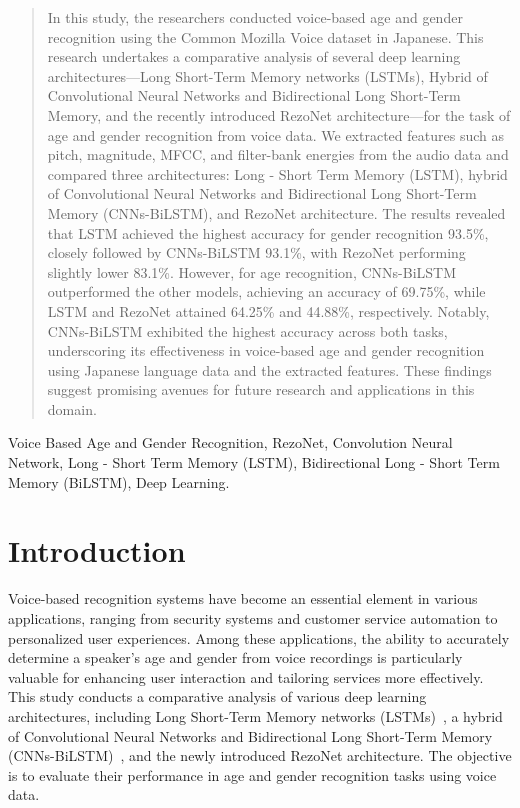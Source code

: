 \documentclass[conference, 10pt,onecolumn]{IEEEtran}
\begin{document}
\begin{abstract}

In this study, the researchers conducted voice-based age and gender recognition using the Common Mozilla Voice dataset in Japanese. This research undertakes a comparative analysis of several deep learning architectures—Long Short-Term Memory networks (LSTMs), Hybrid of Convolutional Neural Networks and Bidirectional Long Short-Term Memory, and the recently introduced RezoNet architecture—for the task of age and gender recognition from voice data. We extracted features such as pitch, magnitude, MFCC, and filter-bank energies from the audio data and compared three architectures: Long - Short Term Memory (LSTM), hybrid of Convolutional Neural Networks and Bidirectional Long Short-Term Memory (CNNs-BiLSTM), and RezoNet architecture. The results revealed that LSTM achieved the highest accuracy for gender recognition 93.5\%, closely followed by CNNs-BiLSTM 93.1\%, with RezoNet performing slightly lower 83.1\%. However, for age recognition, CNNs-BiLSTM outperformed the other models, achieving an accuracy of 69.75\%, while LSTM and RezoNet attained 64.25\% and 44.88\%, respectively. Notably, CNNs-BiLSTM exhibited the highest accuracy across both tasks, underscoring its effectiveness in voice-based age and gender recognition using Japanese language data and the extracted features. These findings suggest promising avenues for future research and applications in this domain.
\end{abstract}

\begin{IEEEkeywords}
Voice Based Age and Gender Recognition, RezoNet, Convolution Neural Network, Long - Short Term Memory (LSTM), Bidirectional Long - Short Term Memory (BiLSTM), Deep Learning.
\end{IEEEkeywords}

\section{Introduction}        
Voice-based recognition systems have become an essential element in various applications, ranging from security systems and customer service automation to personalized user experiences. Among these applications, the ability to accurately determine a speaker's age and gender from voice recordings is particularly valuable for enhancing user interaction and tailoring services more effectively. This study conducts a comparative analysis of various deep learning architectures, including Long Short-Term Memory networks (LSTMs)~\cite{riesmeier2022late}, a hybrid of Convolutional Neural Networks and Bidirectional Long Short-Term Memory (CNNs-BiLSTM)~\cite{kattenborn2021review}, and the newly introduced RezoNet architecture. The objective is to evaluate their performance in age and gender recognition tasks using voice data.
\end{document}
